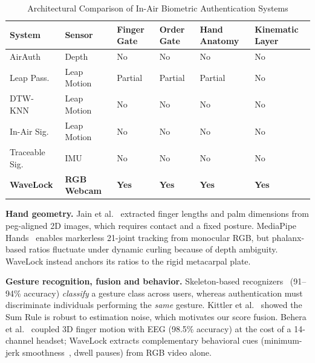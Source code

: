 \documentclass[conference]{IEEEtran}
\begin{document}
\begin{table}[t]
\centering
\caption{Architectural Comparison of In-Air Biometric Authentication Systems}
\label{tab:related_work_comparison}
\scriptsize
\begin{tabular}{@{}L{1.8cm}C{1.1cm}C{1.0cm}C{1.0cm}C{1.0cm}C{1.0cm}@{}}
\toprule
\textbf{System} & \textbf{Sensor} & \textbf{Finger Gate} & \textbf{Order Gate} & \textbf{Hand Anatomy} & \textbf{Kinematic Layer} \\
\midrule
AirAuth~\cite{airauth} & Depth & No & No & No & No \\
Leap Pass.~\cite{leappassword} & Leap Motion & Partial & Partial & Partial & No \\
DTW-KNN~\cite{dtwknn} & Leap Motion & No & No & No & No \\
In-Air Sig.~\cite{inairsig} & Leap Motion & No & No & No & No \\
Traceable Sig.~\cite{traceablesig} & IMU & No & No & No & No \\
\textbf{WaveLock} & \textbf{RGB Webcam} & \textbf{Yes} & \textbf{Yes} & \textbf{Yes} & \textbf{Yes} \\
\bottomrule
\end{tabular}
\end{table}

\textbf{Hand geometry.} Jain et al.~\cite{jain1999} extracted finger lengths and palm dimensions from peg-aligned 2D images, which requires contact and a fixed posture. MediaPipe Hands~\cite{mediapipe} enables markerless 21-joint tracking from monocular RGB, but phalanx-based ratios fluctuate under dynamic curling because of depth ambiguity. WaveLock instead anchors its ratios to the rigid metacarpal plate.

\textbf{Gesture recognition, fusion and behavior.} Skeleton-based recognizers~\cite{plouffe2016,devineau2018,dhgd2024} (91--94\% accuracy) \textit{classify} a gesture class across users, whereas authentication must discriminate individuals performing the \textit{same} gesture. Kittler et al.~\cite{kittler1998} showed the Sum Rule is robust to estimation noise, which motivates our score fusion. Behera et al.~\cite{behera2021} coupled 3D finger motion with EEG (98.5\% accuracy) at the cost of a 14-channel headset; WaveLock extracts complementary behavioral cues (minimum-jerk smoothness~\cite{flash1985}, dwell pauses) from RGB video alone.


\end{document}
